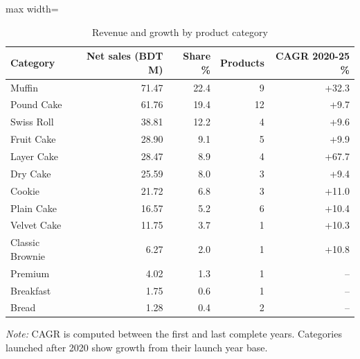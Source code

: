 \begin{table}[htbp]
\centering
\small
\caption{Revenue and growth by product category}
\label{tab:category}
\begin{adjustbox}{max width=\linewidth}
\begin{tabular}{lrrrr}
\toprule
\textbf{Category} & \textbf{Net sales (BDT M)} & \textbf{Share \%} & \textbf{Products} & \textbf{CAGR 2020-25 \%} \\
\midrule
Muffin & 71.47 & 22.4 & 9 & +32.3 \\
Pound Cake & 61.76 & 19.4 & 12 & +9.7 \\
Swiss Roll & 38.81 & 12.2 & 4 & +9.6 \\
Fruit Cake & 28.90 & 9.1 & 5 & +9.9 \\
Layer Cake & 28.47 & 8.9 & 4 & +67.7 \\
Dry Cake & 25.59 & 8.0 & 3 & +9.4 \\
Cookie & 21.72 & 6.8 & 3 & +11.0 \\
Plain Cake & 16.57 & 5.2 & 6 & +10.4 \\
Velvet Cake & 11.75 & 3.7 & 1 & +10.3 \\
Classic Brownie & 6.27 & 2.0 & 1 & +10.8 \\
Premium & 4.02 & 1.3 & 1 & -- \\
Breakfast & 1.75 & 0.6 & 1 & -- \\
Bread & 1.28 & 0.4 & 2 & -- \\
\bottomrule
\end{tabular}
\end{adjustbox}
\par\smallskip\parbox{0.92\linewidth}{\footnotesize\emph{Note:} CAGR is computed between the first and last complete years. Categories launched after 2020 show growth from their launch year base.}
\end{table}